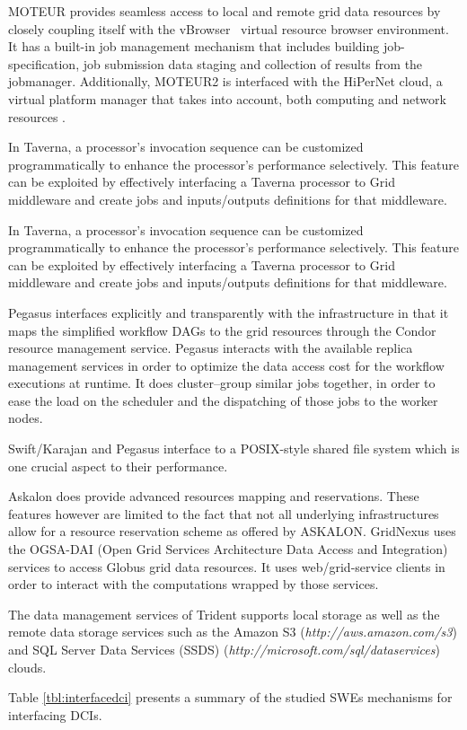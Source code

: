 MOTEUR provides seamless access to local and remote grid data resources by
closely coupling itself with the vBrowser~\cite{olabarriaga-deboer-etal:2006}
virtual resource browser environment. It has a built-in job management
mechanism that includes building job-specification, job submission data staging
and collection of results from the jobmanager. Additionally, MOTEUR2 is
interfaced with the HiPerNet cloud, a virtual platform manager that takes into
account, both computing and network resources
\cite{vicat-blancprimet-roca-etal:2009}.

In Taverna, a processor's invocation sequence can be customized
programmatically to enhance the processor's performance selectively. This
feature can be exploited by effectively interfacing a Taverna processor to Grid
middleware and create jobs and inputs/outputs definitions for that middleware.

In Taverna, a processor's invocation sequence can be customized
programmatically to enhance the processor's performance selectively. This
feature can be exploited by effectively interfacing a Taverna processor to Grid
middleware and create jobs and inputs/outputs definitions for that middleware.

Pegasus interfaces explicitly and transparently with the infrastructure in that
it maps the simplified workflow DAGs to the grid resources through the Condor
resource management service. Pegasus interacts with the available replica
management services in order to optimize the data access cost for the workflow
executions at runtime. It does cluster--group similar jobs together, in order
to ease the load on the scheduler and the dispatching of those jobs to the
worker nodes.

Swift/Karajan and Pegasus interface to a POSIX-style shared file system which
is one crucial aspect to their performance. %

Askalon does provide advanced resources mapping and reservations. These
features however are limited to the fact that not all underlying
infrastructures allow for a resource reservation scheme as offered by ASKALON.
GridNexus uses the OGSA-DAI (Open Grid Services Architecture Data Access and
Integration) services to access Globus grid data resources. It uses
web/grid-service clients in order to interact with the computations wrapped by
those services.

The data management services of Trident supports local storage as well as the
remote data storage services such as the Amazon S3
(\textit{http://aws.amazon.com/s3}) and SQL Server Data Services (SSDS)
(\textit{http://microsoft.com/sql/dataservices}) clouds.

Table \ref{tbl:interfacedci} presents a summary of the studied SWEs mechanisms for interfacing DCIs.
